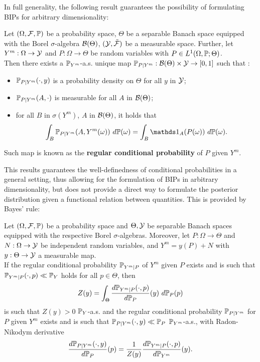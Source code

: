 In full generality, the following result guarantees the possibility of formulating BIPs for arbitrary dimensionality:
\begin{thm} 
    Let $ (\Omega, \mathcal F , \mathbb P) $ be a probability space, $\Theta$ be a separable Banach space equipped with the Borel $\sigma$-algebra $\mathcal B (\Theta)$, $(\mathcal Y, \tilde{\mathcal F})$ be a measurable space.
    Further, let $Y^m:\Omega \rightarrow \mathcal Y$ and $P : \Omega \rightarrow \Theta$ be random variables with $P \in L^1(\Omega, \mathbb P; \Theta) $. \\
    Then there exists a $\mathbb P_{Y^m}$-a.s. unique map $\mathbb P_{P \mid Y^m} : \mathcal B (\Theta) \times \mathcal Y \rightarrow [0,1] $ such that :
    \begin{itemize}
        \item $\mathbb P_{P \mid Y^m}(\cdot, y)$ is a probability density on $\Theta$ for all $y$ in $\mathcal Y$;
        \item $\mathbb P_{P \mid Y^m}(A, \cdot)$ is measurable for all $A$ in $\mathcal B (\Theta)$;
        \item for all $B$ in $\sigma(Y^m)$, $A$ in $\mathcal B (\Theta)$, it holds that
                \[ 
                \int_B \bb P_{P \mid Y^m}(A, Y^m(\omega)) \ d\bb P(\omega)= \int_B \ind_A(P(\omega)) \ d\bb P(\omega).
                \] 
    \end{itemize}
    Such map is known as the \textbf{regular conditional probability} of $P$ given $Y^m$.
\end{thm}

This results guarantees the well-definedness of conditional probabilities in a general setting, thus allowing for the formulation of BIPs in arbitrary dimensionality, but does not provide a direct way to formulate the posterior distribution given a functional relation between quantities. This is provided by Bayes' rule:

\begin{thm}
    Let $ (\Omega, \mathcal F , \mathbb P) $ be a probability space and $\Theta, \mathcal Y$ be separable Banach spaces equipped with the respective Borel $\sigma$-algebras. 
    Moreover, let $P : \Omega \rightarrow \Theta$ and $N:\Omega \rightarrow \mathcal Y$ be independent random variables, and $ Y^m = y(P) + N$ with $y: \Theta \rightarrow \mathcal Y$ a measurable map. \\
    If the regular conditional probability $\mathbb P_{Y^m\mid P}$ of $Y^m$ given $P$ exists and is such that $\mathbb P_{Y^m\mid P}(\cdot, p) \ll \mathbb P _Y$ holds for all $p \in \Theta$, then 
    \[ Z(y) = \int_\Theta \frac{d\mathbb P_{Y^m\mid P}(\cdot, p)}{d\mathbb P_P}(y) \ d\mathbb P_P(p)
     \]
    is such that $ Z(y) > 0$ $\mathbb P_Y$-a.s. and the regular conditional probability $\mathbb P_{P\mid Y^m}$ for $P$ given $Y^m$ exists and is such that $\mathbb P_{P\mid Y^m}(\cdot, y) \ll \mathbb P _P$ $\mathbb P_{Y^m}$-a.s., with Radon-Nikodym derivative
    \begin{equation}\label{eq:infdimBayes}
        \frac{d\mathbb P_{P\mid Y^m}(\cdot, y)}{d\mathbb P_P}(p) = \frac{1}{Z(y)}\frac{d\mathbb P_{Y^m\mid P}(\cdot, p)}{d\mathbb P_{Y^m}}(y).
    \end{equation}
\end{thm}

